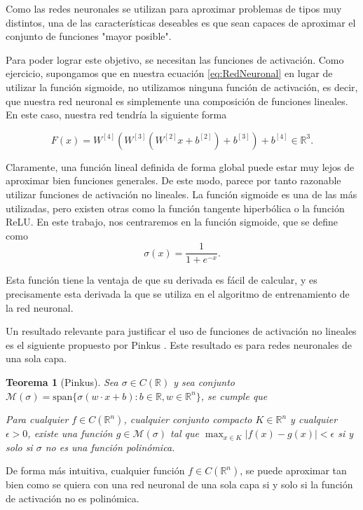\documentclass[a4paper,11pt,spanish, twoside, leqno]{tfg-uam}
\newtheorem{teor}{Teorema}[chapter]
\theoremstyle{definition}
\begin{document}
Como las redes neuronales se utilizan para aproximar problemas de tipos muy distintos, una de las características deseables es que sean  capaces de aproximar el conjunto de funciones "mayor posible".

Para poder lograr este objetivo, se necesitan las funciones de activación. Como ejercicio, supongamos que en nuestra ecuación \eqref{eq:RedNeuronal} en lugar de utilizar la función sigmoide, no utilizamos ninguna función de activación, es decir, que nuestra red neuronal es simplemente una composición de funciones lineales. En este caso, nuestra red tendría la siguiente forma

\begin{equation*}
    F(x)=W^{[4]}(W^{[3]}(W^{[2]}x+b^{[2]})+b^{[3]})+b^{[4]}\in\mathbb{R}^3.
\end{equation*}

Claramente, una función lineal definida de forma global puede estar muy lejos de aproximar bien funciones generales. De este modo, parece por tanto razonable utilizar funciones de activación no lineales. La función sigmoide es una de las más utilizadas, pero existen otras como la función tangente hiperbólica o la función ReLU. En este trabajo, nos centraremos en la función sigmoide, que se define como
\begin{equation*}
    \sigma(x)=\frac{1}{1+e^{-x}}.
\end{equation*}

Esta función tiene la ventaja de que su derivada es fácil de calcular, y es precisamente esta derivada la que se utiliza en el algoritmo de entrenamiento de la red neuronal.

Un resultado relevante para justificar el uso de funciones de activación no lineales es el siguiente propuesto por Pinkus \cite[Theorem 3.1]{pinkus1999approximation}. Este resultado es para redes neuronales de una sola capa.

\begin{teor}[Pinkus]
    Sea $\sigma\in C(\mathbb{R})$ y sea conjunto $\mathcal{M}(\sigma) = \text{span}\{\sigma(w\cdot x + b): b \in \mathbb{R}, w \in \mathbb{R}^n\}$, se cumple que
    
    Para cualquier $f \in C(\mathbb{R}^n)$, cualquier conjunto compacto $K\in \mathbb{R}^n$ y cualquier $\epsilon > 0$, existe una función $g\in \mathcal{M}(\sigma)$ tal que $\max_{x\in K}|f(x)-g(x)|<\epsilon$ si y solo si $\sigma$ no es una función polinómica.
\end{teor}
De forma más intuitiva, cualquier función $f \in C(\mathbb{R}^n)$, se puede aproximar tan bien como se quiera con una red neuronal de una sola capa si y solo si la función de activación no es polinómica.
\end{document}
